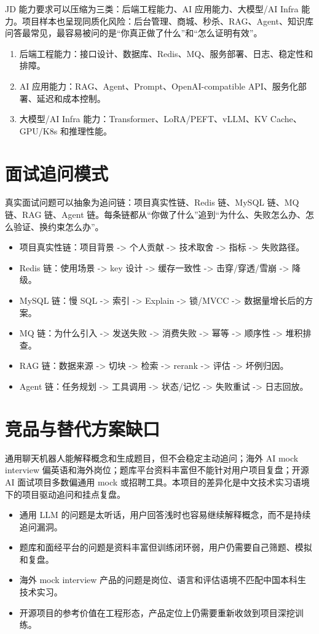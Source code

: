 \documentclass[UTF8,11pt]{ctexart}
\begin{document}
JD 能力要求可以压缩为三类：后端工程能力、AI 应用能力、大模型/AI Infra 能力。项目样本也呈现同质化风险：后台管理、商城、秒杀、RAG、Agent、知识库问答最常见，最容易被问的是“你真正做了什么”和“怎么证明有效”。
\begin{enumerate}
\item 后端工程能力：接口设计、数据库、Redis、MQ、服务部署、日志、稳定性和排障。
\item AI 应用能力：RAG、Agent、Prompt、OpenAI-compatible API、服务化部署、延迟和成本控制。
\item 大模型/AI Infra 能力：Transformer、LoRA/PEFT、vLLM、KV Cache、GPU/K8s 和推理性能。
\end{enumerate}


\FloatBarrier

\section{面试追问模式}

真实面试问题可以抽象为追问链：项目真实性链、Redis 链、MySQL 链、MQ 链、RAG 链、Agent 链。每条链都从“你做了什么”追到“为什么、失败怎么办、怎么验证、换约束怎么办”。
\begin{itemize}
\item 项目真实性链：项目背景 -> 个人贡献 -> 技术取舍 -> 指标 -> 失败路径。
\item Redis 链：使用场景 -> key 设计 -> 缓存一致性 -> 击穿/穿透/雪崩 -> 降级。
\item MySQL 链：慢 SQL -> 索引 -> Explain -> 锁/MVCC -> 数据量增长后的方案。
\item MQ 链：为什么引入 -> 发送失败 -> 消费失败 -> 幂等 -> 顺序性 -> 堆积排查。
\item RAG 链：数据来源 -> 切块 -> 检索 -> rerank -> 评估 -> 坏例归因。
\item Agent 链：任务规划 -> 工具调用 -> 状态/记忆 -> 失败重试 -> 日志回放。
\end{itemize}


\FloatBarrier

\section{竞品与替代方案缺口}


\FloatBarrier

通用聊天机器人能解释概念和生成题目，但不会稳定主动追问；海外 AI mock interview 偏英语和海外岗位；题库平台资料丰富但不能针对用户项目复盘；开源 AI 面试项目多数偏通用 mock 或招聘工具。本项目的差异化是中文技术实习语境下的项目驱动追问和挂点复盘。
\begin{itemize}
\item 通用 LLM 的问题是太听话，用户回答浅时也容易继续解释概念，而不是持续追问漏洞。
\item 题库和面经平台的问题是资料丰富但训练闭环弱，用户仍需要自己筛题、模拟和复盘。
\item 海外 mock interview 产品的问题是岗位、语言和评估语境不匹配中国本科生技术实习。
\item 开源项目的参考价值在工程形态，产品定位上仍需要重新收敛到项目深挖训练。
\end{itemize}
\end{document}
